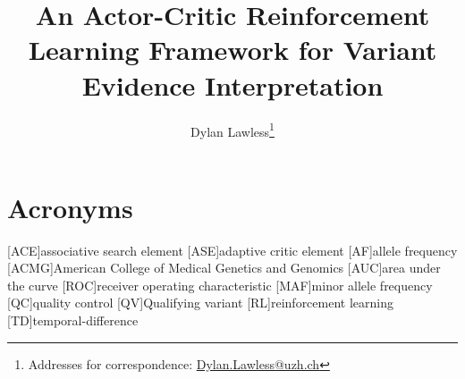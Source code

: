  
\usepackage[printonlyused,withpage,nohyperlinks]{acronym}

\newcommand{\boxlabel}[1]{%
  \refstepcounter{myboxcounter}%
  \label{#1}%
}

\title{An Actor-Critic Reinforcement Learning Framework for Variant Evidence Interpretation}

\author[1]{Dylan Lawless\thanks{Addresses for correspondence: \href{mailto:Dylan.Lawless@uzh.ch}{Dylan.Lawless@uzh.ch}}}

\maketitle
\justify

\section*{Acronyms}
\renewenvironment{description} %
{\list{}{\labelwidth0pt\itemindent-\leftmargin
    \parsep-1em\itemsep0pt\let\makelabel\descriptionlabel}}
               {\endlist}
\begin{acronym} 

[ACE]{associative search element}
[ASE]{adaptive critic element}
[AF]{allele frequency}
[ACMG]{American College of Medical Genetics and Genomics}
[AUC]{area under the curve}
[ROC]{receiver operating characteristic}
[MAF]{minor allele frequency}
[QC]{quality control}
[QV]{Qualifying variant}
[RL]{reinforcement learning}
[TD]{temporal-difference}
\end{acronym}

